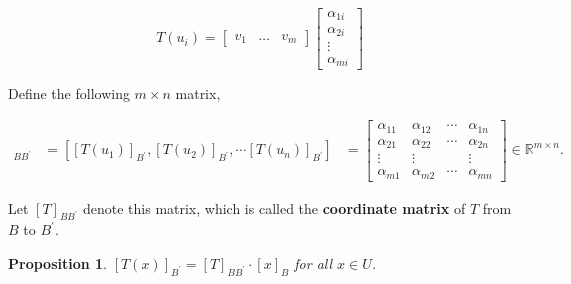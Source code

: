 \documentclass[12pt]{article}
\newtheorem*{proposition}{Proposition}
\theoremstyle{definition}
\begin{document}
\[ T(u_i) =
\begin{bmatrix}
v_1 & \ldots & v_m
\end{bmatrix}
\begin{bmatrix}
\alpha_{1i} \\
\alpha_{2i} \\
\vdots \\
\alpha_{mi}
\end{bmatrix}
\]

\noindent Define the following $m \times n$ matrix,

\begin{align*}
[T]_{BB^{\prime}} &= \left[ [T(u_1)]_{B^{\prime}}, [T(u_2)]_{B^{\prime}}, \cdots [T(u_n)]_{B^{\prime}} \right] 
&= 
\begin{bmatrix}
\alpha_{11} & \alpha_{12} & \cdots & \alpha_{1n} \\
\alpha_{21} & \alpha_{22} & \cdots & \alpha_{2n} \\
\vdots & \vdots & & \vdots \\
\alpha_{m1} & \alpha_{m2} & \cdots & \alpha_{mn}
\end{bmatrix}
\in \mathbb{R}^{m \times n}.
\end{align*} 

Let $[T]_{BB^{\prime}}$ denote this matrix, which is called the \textbf{coordinate matrix} of $T$ 
from $B$ to $B^{\prime}$.

\begin{proposition}
$[T(x)]_{B^{\prime}} = [T]_{BB^{\prime}} \cdot [x]_B$ for all $x \in U$.
\end{proposition}
\end{document}
